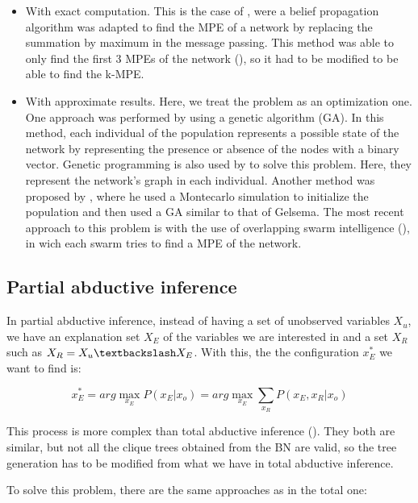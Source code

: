 \documentclass[a4paper,11pt]{article}
\begin{document}
\begin{itemize}
\item With exact computation. This is the case of \cite{dawid1992}, were a belief propagation algorithm was adapted to find the MPE of a network by replacing the summation by maximum in the message passing. This method was able to only find the first 3 MPEs of the network (\cite{nilsson1998}), so it had to be modified to be able to find the k-MPE.

\item With approximate results. Here, we treat the problem as an optimization one. One approach was performed by \cite{gelsema1995} using a genetic algorithm (GA). In this method, each individual of the population represents a possible state of the network by representing the presence or absence of the nodes with a binary vector. Genetic programming is also used by \cite{rojas1993} to solve this problem. Here, they represent the network's graph in each individual. Another method was proposed by \cite{welch1996}, where he used a Montecarlo simulation to initialize the population and then used a GA similar to that of Gelsema. The most recent approach to this problem is with the use of overlapping swarm intelligence (\cite{fortier2013}), in wich each swarm tries to find a MPE of the network.
\end{itemize}

\subsection{Partial abductive inference}

In partial abductive inference, instead of having a set of unobserved variables $X_u$, we have an explanation set $X_E$ of the variables we are interested in and a set $X_R$ such as $X_R = X_u \textbackslash X_E$. With this, the the configuration $x^*_E$ we want to find is:

\begin{equation}
x^*_E = arg\max_{x_E} P(x_E | x_o) = arg\max_{x_E} \sum_{x_R}P(x_E,x_R|x_o)
\label{eqn:pMPE}
\end{equation}

This process is more complex than total abductive inference (\cite{deCampos2002}). They both are similar, but not all the clique trees obtained from the BN are valid, so the tree generation has to be modified from what we have in total abductive inference.

To solve this problem, there are the same approaches as in the total one:
\end{document}
